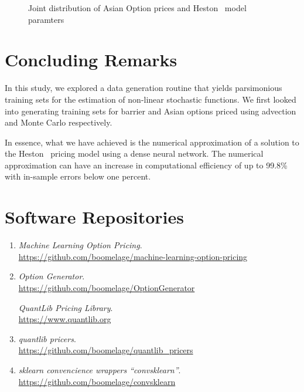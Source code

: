 \documentclass[11pt]{article}
\begin{document}
\begin{figure}[htbp]
\begin{minipage}{0.48\textwidth}
				\caption{Joint distribution of Asian Option prices and Heston~\cite{heston_1993_a} model paramters}
				\label{fig:Shapely Asians}
			\end{minipage}
		\end{figure}%

\section{Concluding Remarks}
	In this study, we explored a data generation routine that yields parsimonious training sets for the estimation of non-linear stochastic functions. We first looked into generating training sets for barrier and Asian options priced using advection and Monte Carlo respectively.
	\par
	In essence, what we have achieved is the numerical approximation of a solution to the Heston~\cite{heston_1993_a} pricing model using a dense neural network. The numerical approximation can have an increase in computational efficiency of up to 99.8\% with in-sample errors below one percent.
	
\vfill
\section{Software Repositories}
	\begin{enumerate}
		
		\item \emph{Machine Learning Option Pricing}. \\
		\url{https://github.com/boomelage/machine-learning-option-pricing}
		
		\item \emph{Option Generator}. \\
		\url{https://github.com/boomelage/OptionGenerator}
		
		 \emph{QuantLib Pricing Library}. \\ 
		\url{https://www.quantlib.org}
		
		\item \emph{quantlib pricers}. \\
		\url{https://github.com/boomelage/quantlib_pricers}
		
		\item \emph{sklearn convencience wrappers ``convsklearn''}. \\ 
		\url{https://github.com/boomelage/convsklearn}
		
	\end{enumerate}
\vfill

\newpage
{}
\printbibliography
\newpage

\end{document}
